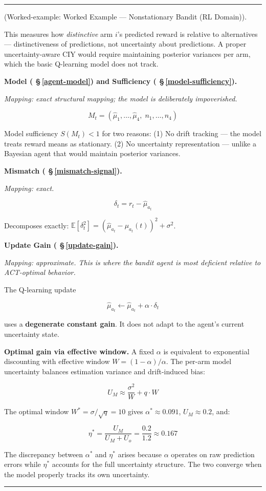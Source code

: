\documentclass[11pt,oneside]{article}
\newcounter{claim}[section]
\renewcommand{\theclaim}{\thesection.\arabic{claim}}
\newenvironment{segment}[2]{%
  \refstepcounter{claim}%
  \bigskip\noindent\hrule\smallskip
  \noindent{\bfseries #1~\theclaim}\enskip(#2).\par\smallskip
  \noindent\ignorespaces
}{%
  \par\smallskip\noindent\hrule\bigskip
}
\newenvironment{remark}[1][]{\begin{segment}{Remark}{#1}}{\end{segment}}
\begin{document}
\begin{remark}[Worked-example: Worked Example — Nonstationary Bandit (RL Domain)]
This measures how \textit{distinctive} arm $i$'s predicted reward is relative to alternatives — distinctiveness of predictions, not uncertainty about predictions. A proper uncertainty-aware CIY would require maintaining posterior variances per arm, which the basic Q-learning model does not track.


\medskip\noindent\textbf{Model ( \S\,\ref{agent-model}) and Sufficiency ( \S\,\ref{model-sufficiency}).}


\textit{Mapping: exact structural mapping; the model is deliberately impoverished.}

$$M_t = (\hat{\mu}_1, \ldots, \hat{\mu}_4,\; n_1, \ldots, n_4)$$

Model sufficiency $S(M_t) < 1$ for two reasons: (1) No drift tracking — the model treats reward means as stationary. (2) No uncertainty representation — unlike a Bayesian agent that would maintain posterior variances.


\medskip\noindent\textbf{Mismatch ( \S\,\ref{mismatch-signal}).}


\textit{Mapping: exact.}

$$\delta_t = r_t - \hat{\mu}_{a_t}$$

Decomposes exactly: $\mathbb{E}[\delta_t^2] = (\hat{\mu}_{a_t} - \mu_{a_t}(t))^2 + \sigma^2$.


\medskip\noindent\textbf{Update Gain ( \S\,\ref{update-gain}).}


\textit{Mapping: approximate. This is where the bandit agent is most deficient relative to ACT-optimal behavior.}

The Q-learning update

$$\hat{\mu}_{a_t} \leftarrow \hat{\mu}_{a_t} + \alpha \cdot \delta_t$$

uses a \textbf{degenerate constant gain}. It does not adapt to the agent's current uncertainty state.

\textbf{Optimal gain via effective window.} A fixed $\alpha$ is equivalent to exponential discounting with effective window $W = (1 - \alpha)/\alpha$. The per-arm model uncertainty balances estimation variance and drift-induced bias:

$$U_M \approx \frac{\sigma^2}{W} + q \cdot W$$

The optimal window $W^* = \sigma / \sqrt{q} = 10$ gives $\alpha^* \approx 0.091$, $U_M \approx 0.2$, and:

$$\eta^* = \frac{U_M}{U_M + U_o} = \frac{0.2}{1.2} \approx 0.167$$

The discrepancy between $\alpha^*$ and $\eta^*$ arises because $\alpha$ operates on raw prediction errors while $\eta^*$ accounts for the full uncertainty structure. The two converge when the model properly tracks its own uncertainty.



\end{remark}
\end{document}
